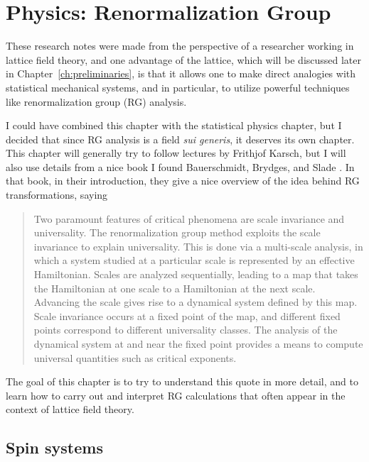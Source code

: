 \chapter{Physics: Renormalization Group}

These research notes were made from the perspective of a researcher working
in lattice field theory, and one advantage of the lattice, which will be
discussed later in Chapter~\ref{ch:preliminaries}, is that it allows one
to make direct analogies with statistical mechanical systems, and in
particular, to utilize powerful techniques like renormalization group (RG)
analysis.

I could have combined this chapter with the statistical physics chapter, but I
decided that since RG analysis is a field {\it sui generis},
it deserves its own chapter.  This chapter will generally try to follow 
lectures by Frithjof Karsch, but I will also use details from a nice
book I found Bauerschmidt, Brydges, and Slade \cite{Bauerschmidt_2019}.
In that book, in their introduction, they give a nice overview of the idea
behind RG transformations, saying
\begin{quote}
Two paramount features of critical phenomena are scale invariance and 
universality. The renormalization group method exploits the scale 
invariance to explain universality. This is done via a multi-scale analysis, 
in which a system studied at a particular scale is represented by an 
effective Hamiltonian. Scales are analyzed sequentially, leading to a map 
that takes the Hamiltonian at one scale to a Hamiltonian at the next scale. 
Advancing the scale gives rise to a dynamical system defined by this map. 
Scale invariance occurs at a fixed point of the map, and different fixed
points correspond to different universality classes. The analysis of the 
dynamical system at and near the fixed point provides a means to compute 
universal quantities such as critical exponents. 
\end{quote} 
The goal of this chapter is to try to understand this quote in more detail,
and to learn how to carry out and interpret RG calculations that often
appear in the context of lattice field theory.

\section{Spin systems}





